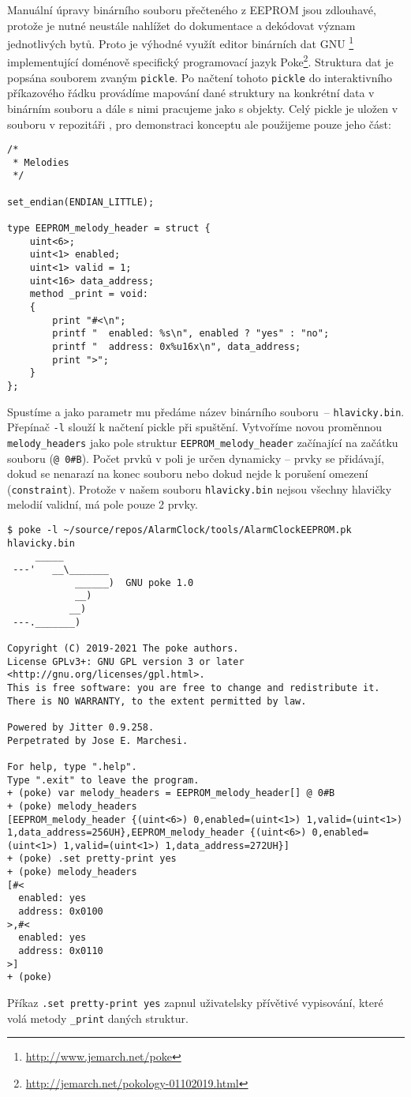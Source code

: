 Manuální úpravy binárního souboru přečteného z EEPROM jsou zdlouhavé, protože
je nutné neustále nahlížet do dokumentace a dekódovat význam jednotlivých bytů.
Proto je výhodné využít editor binárních dat GNU
\footnote{\url{http://www.jemarch.net/poke}} implementující
doménově specifický programovací jazyk
Poke\footnote{\url{http://jemarch.net/pokology-01102019.html}}.
Struktura dat je popsána souborem zvaným \texttt{pickle}. Po načtení tohoto
\texttt{pickle} do interaktivního příkazového řádku  provádíme
mapování dané struktury na konkrétní data v binárním souboru a dále s nimi
pracujeme jako s objekty. Celý pickle je uložen v souboru
 v repozitáři , pro
demonstraci konceptu ale použijeme pouze jeho část:
\begin{lstlisting}[language=Poke]
/*
 * Melodies
 */

set_endian(ENDIAN_LITTLE);

type EEPROM_melody_header = struct {
    uint<6>;
    uint<1> enabled;
    uint<1> valid = 1;
    uint<16> data_address;
    method _print = void:
    {
        print "#<\n";
        printf "  enabled: %s\n", enabled ? "yes" : "no";
        printf "  address: 0x%u16x\n", data_address;
        print ">";
    }
};
\end{lstlisting}

Spustíme  a jako parametr mu předáme název binárního souboru~--
\texttt{hlavicky.bin}. Přepínač \texttt{-l} slouží k načtení pickle při
spuštění. Vytvoříme novou proměnnou \verb|melody_headers| jako pole struktur
\verb|EEPROM_melody_header| začínající na začátku souboru (\verb|@ 0#B|). Počet
prvků v poli je určen dynamicky -- prvky se přidávají, dokud se nenarazí na
konec souboru nebo dokud nejde k porušení omezení (\texttt{constraint}).
Protože v našem souboru \texttt{hlavicky.bin} nejsou všechny hlavičky melodií
validní, má pole pouze 2 prvky.
\begin{lstlisting}[style=terminal]
$ poke -l ~/source/repos/AlarmClock/tools/AlarmClockEEPROM.pk hlavicky.bin
     _____
 ---'   __\_______
            ______)  GNU poke 1.0
            __)
           __)
 ---._______)

Copyright (C) 2019-2021 The poke authors.
License GPLv3+: GNU GPL version 3 or later <http://gnu.org/licenses/gpl.html>.
This is free software: you are free to change and redistribute it.
There is NO WARRANTY, to the extent permitted by law.

Powered by Jitter 0.9.258.
Perpetrated by Jose E. Marchesi.

For help, type ".help".
Type ".exit" to leave the program.
+ (poke) var melody_headers = EEPROM_melody_header[] @ 0#B
+ (poke) melody_headers
[EEPROM_melody_header {(uint<6>) 0,enabled=(uint<1>) 1,valid=(uint<1>) 1,data_address=256UH},EEPROM_melody_header {(uint<6>) 0,enabled=(uint<1>) 1,valid=(uint<1>) 1,data_address=272UH}]
+ (poke) .set pretty-print yes
+ (poke) melody_headers
[#<
  enabled: yes
  address: 0x0100
>,#<
  enabled: yes
  address: 0x0110
>]
+ (poke)
\end{lstlisting}
Příkaz \verb|.set pretty-print yes| zapnul uživatelsky přívětivé vypisování,
které volá metody \verb|_print| daných struktur.

